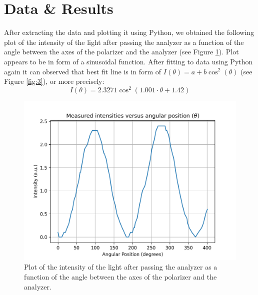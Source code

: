 \documentclass[10pt]{article}
\begin{document}
\section{Data \& Results}
After extracting the data and plotting it using Python, we obtained the following plot of the intensity of the light after passing the analyzer as a function of the angle between the axes of the polarizer and the analyzer (see Figure \ref{fig:2}).
Plot appears to be in form of a sinusoidal function. After fitting to data using Python again it can observed that best fit line is in form of $I(\theta) = a + b\cos^2(\theta)$ (see Figure \ref{fig:3}), or more precisely:
\begin{equation}
  I(\theta) = 2.3271\cos^2(1.001\cdot\theta+1.42)
  \label{eq:2}
\end{equation}
\begin{figure}[ht]
  \centering
  \includegraphics[scale=0.6]{plots/plot1.png}
  \caption{Plot of the intensity of the light after passing the analyzer as a function of the angle between the axes of the polarizer and the analyzer.}
  \label{fig:2}
\end{figure}
\end{document}
